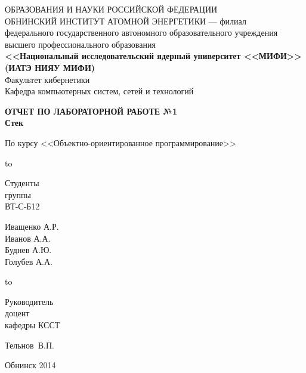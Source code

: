 
\begin{titlepage}
\newpage

\begin{center}
{\small{} ОБРАЗОВАНИЯ И НАУКИ РОССИЙСКОЙ ФЕДЕРАЦИИ\\
ОБНИНСКИЙ ИНСТИТУТ АТОМНОЙ ЭНЕРГЕТИКИ --- филиал}\\
федерального государственного автономного образовательного учреждения\\
высшего профессионального образования\\
{\bf<<Национальный исследовательский ядерный университет <<МИФИ>>\\
(ИАТЭ НИЯУ МИФИ)}\\
\vspace{2em}
Факультет кибернетики\\
Кафедра компьютерных систем, сетей и технологий
\end{center}
\vspace{2em}


\vspace{5em}
\begin{center}
\textbf{ОТЧЕТ ПО ЛАБОРАТОРНОЙ РАБОТЕ №1\\ Стек}
\end{center}


\begin{center}
По курсу <<Объектно-ориентированное программирование>>
\end{center}

\vspace{6em}

\hbox to \textwidth
{\parbox{6 cm}{Студенты\\ группы\\ ВТ-С-Б12}\dotfill \parbox{4 cm}{
\begin{flushright}Иващенко А.Р.\\ Иванов А.А.\\ Буднев А.Ю.\\ Голубев А.А.\end{flushright}}}
\vspace{2em}

\hbox to \textwidth
{\parbox{6 cm}{Руководитель\\доцент\\ кафедры КССТ}\dotfill \parbox{4 cm}{
\begin{flushright}Тельнов~В.П.\end{flushright}}}
\vspace{2em}



\vspace{\fill}

\begin{center}
Обнинск 2014
\end{center}

\end{titlepage}